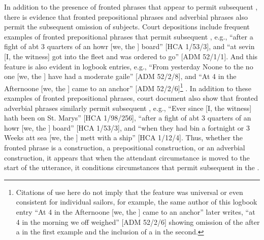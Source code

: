 In addition to the presence of fronted  phrases that appear to permit subsequent , there is evidence that fronted prepositional phrases and adverbial phrases also permit the subsequent omission of  subjects. Court depositions include frequent examples of fronted prepositional phrases that permit subsequent , e.g., “after a fight of abt 3 quarters of an howr [we, the ] board” [HCA 1/53/3], and “at sevin [I, the witness] got into the fleet and was ordered to go” [ADM 52/1/1]. And this feature is also evident in logbook entries, e.g., “From yesterday Noone to the no one [we, the ] have had a moderate gaile” [ADM 52/2/8], and “At 4 in the Afternoone [we, the ] came to an anchor” [ADM 52/2/6]\footnote{Citations of use here do not imply that the feature was universal or even consistent for individual sailors, for example, the same author of this logbook entry “At 4 in the Afternoone [we, the ] came to an anchor” later writes, “at 4 in the morning we off weighed” [ADM 52/2/6] showing omission of the  after a  in the first example and the inclusion of a  in the second.} .  In addition to these examples of fronted prepositional phrases, court document also show that fronted adverbial phrases similarly permit subsequent , e.g., “Ever since [I, the witness] hath been on St. Marys” [HCA 1/98/256], “after a fight of abt 3 quarters of an howr [we, the ] board” [HCA 1/53/3], and “when they had bin a fortnight or 3 Weeks att sea [we, the ] mett with a ship” [HCA 1/12/4]. Thus, whether the fronted phrase is a  construction, a prepositional construction, or an adverbial construction, it appears that when the attendant circumstance is moved to the start of the utterance, it conditions circumstances that permit subsequent  in the . 

